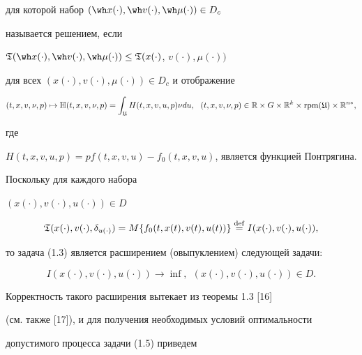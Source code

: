 для которой набор $(\wh x(\cdot),\wh v(\cdot),\wh\mu(\cdot))\in D_{c}$


называется решением, если


$\gT(\wh x(\cdot),\wh v(\cdot),\wh\mu(\cdot))\le


\gT(x(\cdot)$, $v(\cdot),\mu(\cdot))$ 




для всех $(x(\cdot),v(\cdot),\mu(\cdot))\in D_{c}$ и отображение


$$


(t,x,v,\nu,p)\mapsto\Bbb H(t,x,v,\nu,p)=


\int_{\gU}H(t,x,v,u,p)\nu du,


\ \ (t,x,v,\nu,p)\in\R\times G\times\R^{k}\times\rpm(\gU)\times\R^{n*},


$$


где


$H(t,x,v,u,p)=pf(t,x,v,u)-f_{0}(t,x,v,u)$, является функцией Понтрягина.





\begin{notes}


Поскольку для каждого набора


$(x(\cdot),v(\cdot),u(\cdot))\in D$


\begin{equation}


\gT(x(\cdot),v(\cdot),\delta_{u(\cdot)})=


M\{f_{0}(t,x(t),v(t),u(t))\}\overset{\mathrm{def}}{=}{}


I(x(\cdot),v(\cdot),u(\cdot)),


\end{equation}


то задача (1.3) является расширением (овыпуклением) следующей задачи:


\begin{equation}


I(x(\cdot),v(\cdot),u(\cdot))\to\inf,


\ \ (x(\cdot),v(\cdot),u(\cdot))\in D.


\end{equation}


Корректность такого расширения вытекает из теоремы 1.3 [16]


(см. также [17]), и для получения необходимых условий оптимальности


допустимого процесса задачи (1.5) приведем


\end{notes}





